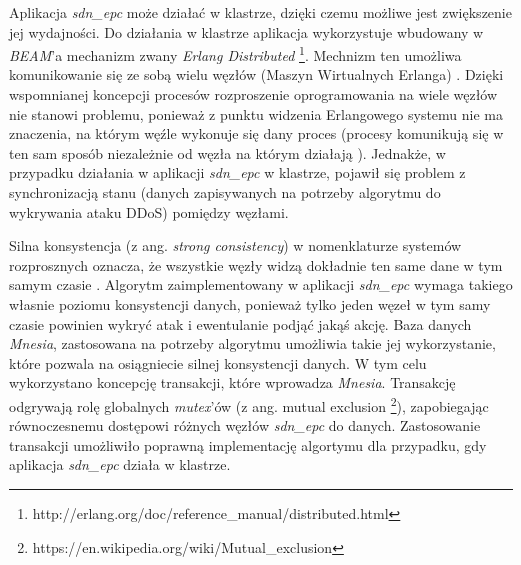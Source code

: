 Aplikacja \textit{sdn\_epc} może działać w klastrze, dzięki czemu możliwe jest
zwiększenie jej wydajności. Do działania w klastrze aplikacja wykorzystuje
wbudowany w \textit{BEAM}'a mechanizm zwany \textit{Erlang Distributed}
\footnote{http://erlang.org/doc/reference\_manual/distributed.html}. Mechnizm
ten umożliwa komunikowanie się ze sobą wielu węzłów (Maszyn Wirtualnych
Erlanga) \cite{erldocs}. Dzięki wspomnianej koncepcji procesów rozproszenie
oprogramowania na wiele węzłów nie stanowi problemu, ponieważ z punktu widzenia
Erlangowego systemu nie ma znaczenia, na którym węźle wykonuje się dany proces
(procesy komunikują się w ten sam sposób niezależnie od węzła na którym
działają \cite{erldocs}). Jednakże, w przypadku działania w aplikacji
\textit{sdn\_epc} w klastrze, pojawił się problem z synchronizacją stanu (danych
zapisywanych na potrzeby algorytmu do wykrywania ataku DDoS) pomiędzy węzłami.

Silna konsystencja (z ang. \textit{strong consistency}) w nomenklaturze systemów
rozprosznych oznacza, że wszystkie węzły widzą dokładnie ten same dane w
tym samym czasie \cite{distrforfunandprof}. Algorytm zaimplementowany w
aplikacji \textit{sdn\_epc} wymaga takiego własnie poziomu konsystencji danych,
ponieważ tylko jeden węzeł w tym samy czasie powinien wykryć atak i ewentulanie
podjąć jakąś akcję. Baza danych \textit{Mnesia}, zastosowana na potrzeby
algorytmu umożliwia takie jej wykorzystanie, które pozwala na osiągniecie silnej
konsystencji danych. W tym celu wykorzystano koncepcję transakcji, które
wprowadza \textit{Mnesia}. Transakcję odgrywają rolę globalnych \textit{mutex}'ów
(z ang. mutual exclusion
\footnote{https://en.wikipedia.org/wiki/Mutual\_exclusion}), zapobiegając
równoczesnemu dostępowi różnych węzłów \textit{sdn\_epc} do danych. Zastosowanie
transakcji umożliwiło poprawną implementację algortymu dla przypadku, gdy
aplikacja \textit{sdn\_epc} działa w klastrze.